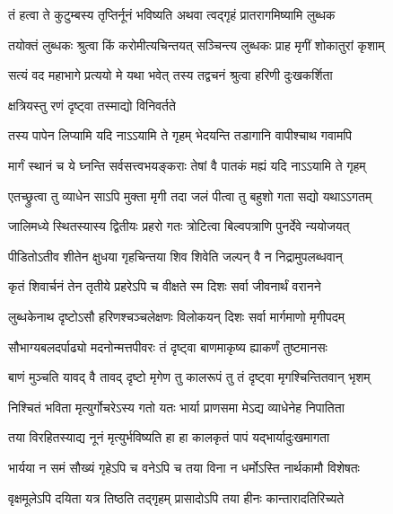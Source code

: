 \twolineshloka
{तं हत्वा ते कुटुम्बस्य तृप्तिर्नूनं भविष्यति}
{अथवा त्वद्गृहं प्रातरागमिष्यामि लुब्धक}%

\twolineshloka
{तयोक्तं लुब्धकः श्रुत्वा किं करोमीत्यचिन्तयत्}
{सञ्चिन्त्य लुब्धकः प्राह मृगीं शोकातुरां कृशाम्}%

\twolineshloka
{सत्यं वद महाभागे प्रत्ययो मे यथा भवेत्}
{तस्य तद्वचनं श्रुत्वा हरिणी दुःखकर्शिता}%



\onelineshloka
{क्षत्रियस्तु रणं दृष्ट्वा तस्माद्यो विनिवर्तते}%

\twolineshloka
{तस्य पापेन लिप्यामि यदि नाऽऽयामि ते गृहम्}
{भेदयन्ति तडागानि वापीश्चाथ गवामपि}%

\twolineshloka
{मार्गं स्थानं च ये घ्नन्ति सर्वसत्त्वभयङ्कराः}
{तेषां वै पातकं मह्यं यदि नाऽऽयामि ते गृहम्}%

\twolineshloka
{एतच्छ्रुत्वा तु व्याधेन साऽपि मुक्ता मृगी तदा}
{जलं पीत्वा तु बहुशो गता सद्यो यथाऽऽगतम्}%

\twolineshloka
{जालिमध्ये स्थितस्यास्य द्वितीयः प्रहरो गतः}
{त्रोटित्वा बिल्वपत्राणि पुनर्देवे न्ययोजयत्}%

\twolineshloka
{पीडितोऽतीव शीतेन क्षुधया गृहचिन्तया}
{शिव शिवेति जल्पन् वै न निद्रामुपलब्धवान्}%

\twolineshloka
{कृतं शिवार्चनं तेन तृतीये प्रहरेऽपि च}
{वीक्षते स्म दिशः सर्वा जीवनार्थं वरानने}%

\twolineshloka
{लुब्धकेनाथ दृष्टोऽसौ हरिणश्चञ्चलेक्षणः}
{विलोकयन् दिशः सर्वा मार्गमाणो मृगीपदम्}%

\twolineshloka
{सौभाग्यबलदर्पाढ्यो मदनोन्मत्तपीवरः}
{तं दृष्ट्वा बाणमाकृष्य ह्याकर्णं तुष्टमानसः}%

\twolineshloka
{बाणं मुञ्चति यावद् वै तावद् दृष्टो मृगेण तु}
{कालरूपं तु तं दृष्ट्वा मृगश्चिन्तितवान् भृशम्}%

\twolineshloka
{निश्चितं भविता मृत्युर्गोचरेऽस्य गतो यतः}
{भार्या प्राणसमा मेऽद्य व्याधेनेह निपातिता}%

\twolineshloka
{तया विरहितस्याद्य नूनं मृत्युर्भविष्यति}
{हा हा कालकृतं पापं यद्भार्यादुःखमागता}%

\twolineshloka
{भार्यया न समं सौख्यं गृहेऽपि च वनेऽपि च}
{तया विना न धर्मोऽस्ति नार्थकामौ विशेषतः}%

\twolineshloka
{वृक्षमूलेऽपि दयिता यत्र तिष्ठति तद्गृहम्}
{प्रासादोऽपि तया हीनः कान्तारादतिरिच्यते}%

